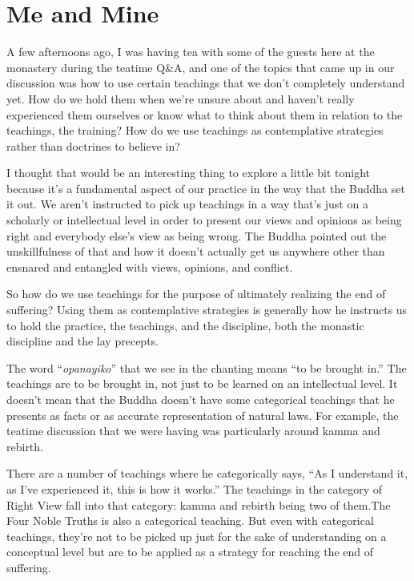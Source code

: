 
\chapter{Me and Mine}


A few afternoons ago, I was having tea with some of the guests here at the monastery during the teatime Q\&A, and one of the topics that came up in our discussion was how to use certain teachings that we don't completely understand yet. How do we hold them when we're unsure about and haven't really experienced them ourselves or know what to think about them in relation to the teachings, the training? How do we use teachings as contemplative strategies rather than doctrines to believe in?

I thought that would be an interesting thing to explore a little bit tonight because it's a fundamental aspect of our practice in the way that the Buddha set it out. We aren't instructed to pick up teachings in a way that's just on a scholarly or intellectual level in order to present our views and opinions as being right and everybody else's view as being wrong. The Buddha pointed out the unskillfulness of that and how it doesn't actually get us anywhere other than ensnared and entangled with views, opinions, and conflict.

So how do we use teachings for the purpose of ultimately realizing the end of suffering? Using them as contemplative strategies is generally how he instructs us to hold the practice, the teachings, and the discipline, both the monastic discipline and the lay precepts.

The word ``\emph{opanayiko}'' that we see in the chanting means ``to be brought in.'' The teachings are to be brought in, not just to be learned on an intellectual level. It doesn't mean that the Buddha doesn't have some categorical teachings that he presents as facts or as accurate representation of natural laws. For example, the teatime discussion that we were having was particularly around kamma and rebirth.

There are a number of teachings where he categorically says, ``As I understand it, as I've experienced it, this is how it works.'' The teachings in the category of Right View fall into that category: kamma and rebirth being two of them.The Four Noble Truths is also a categorical teaching. But even with categorical teachings, they're not to be picked up just for the sake of understanding on a conceptual level but are to be applied as a strategy for reaching the end of suffering.

